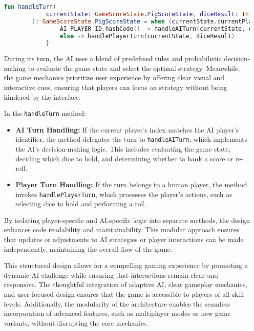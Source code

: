 \begin{lstlisting}[language=Kotlin, caption={handleTurn Function}, label=lst:handleTurn]
    fun handleTurn(
            currentState: GameScoreState.PigScoreState, diceResult: Int? = null
        ): GameScoreState.PigScoreState = when (currentState.currentPlayerIndex) {
                AI_PLAYER_ID.hashCode() -> handleAITurn(currentState, diceResult)
                else -> handlePlayerTurn(currentState, diceResult)
            }
\end{lstlisting}

During its turn, the AI uses a blend of predefined rules and probabilistic decision-making to evaluate the game state and select the optimal strategy. Meanwhile, the game mechanics prioritize user experience by offering clear visual and interactive cues, ensuring that players can focus on strategy without being hindered by the interface.

In the \texttt{handleTurn} method:
\begin{itemize}
    \item \textbf{AI Turn Handling:} If the current player's index matches the AI player's identifier, the method delegates the turn to \texttt{handleAITurn}, which implements the AI's decision-making logic. This includes evaluating the game state, deciding which dice to hold, and determining whether to bank a score or re-roll.
    \item \textbf{Player Turn Handling:} If the turn belongs to a human player, the method invokes \texttt{handlePlayerTurn}, which processes the player's actions, such as selecting dice to hold and performing a roll.
\end{itemize}

By isolating player-specific and AI-specific logic into separate methods, the design enhances code readability and maintainability. This modular approach ensures that updates or adjustments to AI strategies or player interactions can be made independently, maintaining the overall flow of the game.

This structured design allows for a compelling gaming experience by promoting a dynamic AI challenge while ensuring that interactions remain clear and responsive. The thoughtful integration of adaptive AI, clear gameplay mechanics, and user-focused design ensures that the game is accessible to players of all skill levels. Additionally, the modularity of the architecture enables the seamless incorporation of advanced features, such as multiplayer modes or new game variants, without disrupting the core mechanics.

